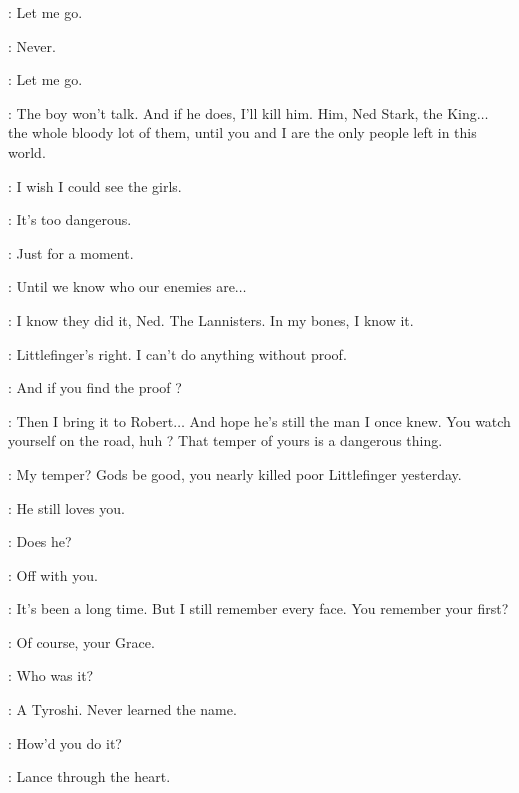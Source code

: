 \CERSEI: Let me go. 

\JAIME: Never. 

\CERSEI: Let me go. 

\JAIME: The boy won't talk. And if he does, I'll kill him. Him, Ned Stark, the King$\ldots$ the whole bloody lot of them, until you and I are the only people left in this world. 

\scene



\CATELYN: I wish I could see the girls. 

\NED: It's too dangerous. 

\CATELYN: Just for a moment. 

\NED: Until we know who our enemies are$\ldots$ 

\CATELYN: I know they did it, Ned. The Lannisters. In my bones, I know it. 

\NED: Littlefinger's right. I can't do anything without proof. 

\CATELYN: And if you find the proof ? 

\NED: Then I bring it to Robert$\ldots$ And hope he's still the man I once knew. You watch yourself on the road, huh ? That temper of yours is a dangerous thing. 

\CATELYN: My temper? Gods be good, you nearly killed poor Littlefinger yesterday. 

\NED: He still loves you. 

\CATELYN: Does he? 

\NED: Off with you. 

\scene



\ROBERT: It's been a long time. But I still remember every face. You remember your first? 

\SELMY: Of course, your Grace. 

\ROBERT: Who was it? 

\SELMY: A Tyroshi. Never learned the name. 

\ROBERT: How'd you do it? 

\SELMY: Lance through the heart. 

